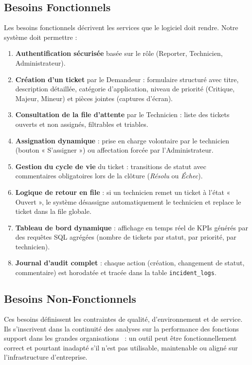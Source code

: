 \subsection{Besoins Fonctionnels}
Les besoins fonctionnels décrivent les services que le logiciel doit rendre. Notre
système doit permettre :
\begin{enumerate}
    \item \textbf{Authentification sécurisée} basée sur le rôle (Reporter, Technicien,
    Administrateur).
    \item \textbf{Création d'un ticket} par le Demandeur : formulaire structuré avec
    titre, description détaillée, catégorie d'application, niveau de priorité (Critique,
    Majeur, Mineur) et pièces jointes (captures d'écran).
    \item \textbf{Consultation de la file d'attente} par le Technicien : liste des
    tickets ouverts et non assignés, filtrables et triables.
    \item \textbf{Assignation dynamique} : prise en charge volontaire par le technicien
    (bouton « S'assigner ») ou affectation forcée par l'Administrateur.
    \item \textbf{Gestion du cycle de vie} du ticket : transitions de statut avec
    commentaires obligatoires lors de la clôture (\textit{Résolu} ou \textit{Échec}).
    \item \textbf{Logique de retour en file} : si un technicien remet un ticket à
    l'état « Ouvert », le système désassigne automatiquement le technicien et replace
    le ticket dans la file globale.
    \item \textbf{Tableau de bord dynamique} : affichage en temps réel de KPIs
    générés par des requêtes SQL agrégées (nombre de tickets par statut, par
    priorité, par technicien).
    \item \textbf{Journal d'audit complet} : chaque action (création, changement de
    statut, commentaire) est horodatée et tracée dans la table \texttt{incident\_logs}.
\end{enumerate}

\subsection{Besoins Non-Fonctionnels}
Ces besoins définissent les contraintes de qualité, d'environnement et de service. Ils
s'inscrivent dans la continuité des analyses sur la performance des fonctions support dans
les grandes organisations~\cite{meghari2014,autissier2008} : un outil peut être fonctionnellement
correct et pourtant inadapté s'il n'est pas utilisable, maintenable ou aligné sur
l'infrastructure d'entreprise.

